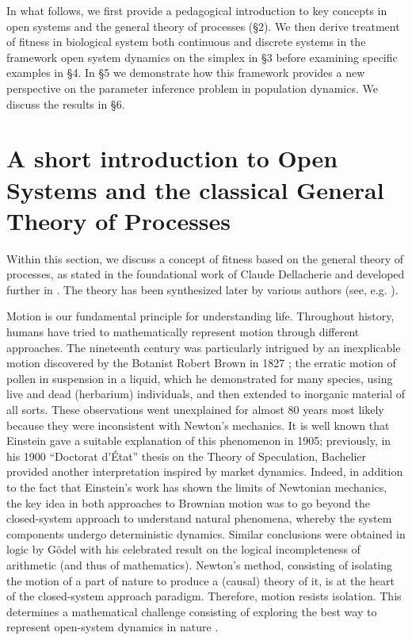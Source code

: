 \documentclass[12pt]{article}
\begin{document}
In what follows, we first provide a pedagogical introduction to key concepts in open systems and the general theory of processes (\S 2). We then derive treatment of fitness in biological system both continuous and discrete systems in the framework open system dynamics on the simplex in \S 3 before examining specific examples in \S 4. In \S 5 we demonstrate how this framework provides a new perspective on the parameter inference problem in population dynamics. We discuss the results in \S 6. 

\section{A short introduction to Open Systems and the  classical General Theory of Processes}\label{sec:fitness-in-GTP}
Within this section, we discuss a concept of fitness based on the general theory of processes, as stated in the foundational work of Claude Dellacherie \citep{Dellacherie-1972} and developed further in \citep{Dellacherie-Meyer}. The theory has been synthesized later by various authors (see, e.g. \citep{Protter}).

Motion is our fundamental principle for understanding life. Throughout history, humans have tried to mathematically represent motion through different approaches. The nineteenth century was particularly intrigued by an inexplicable motion discovered by the Botanist Robert Brown in 1827 \cite{brown1828xxvii}; the erratic motion of pollen in suspension in a liquid, which he demonstrated for many species, using live and dead (herbarium) individuals, and then extended to inorganic material of all sorts. These observations went unexplained for almost 80 years most likely because they were inconsistent with Newton's mechanics. It is well known that Einstein gave a suitable explanation of this phenomenon in 1905; previously, in his 1900 ``Doctorat d'État'' thesis on the Theory of Speculation, Bachelier  provided another interpretation inspired by market dynamics. Indeed, in addition to the fact that Einstein's work has shown the limits of Newtonian mechanics, the key idea in both approaches to Brownian motion was to go beyond the closed-system approach to understand natural phenomena, whereby the system components undergo deterministic dynamics. Similar conclusions were obtained in logic by  G\"odel with his celebrated result on the logical incompleteness of arithmetic (and thus of mathematics). Newton's method, consisting of isolating the motion of a part of nature to produce a (causal) theory of it, is at the heart of the closed-system approach paradigm. Therefore, motion resists isolation. This determines a mathematical challenge consisting of exploring the best way to represent open-system dynamics in nature \cite{Rebolledo:2019th}.
\end{document}
